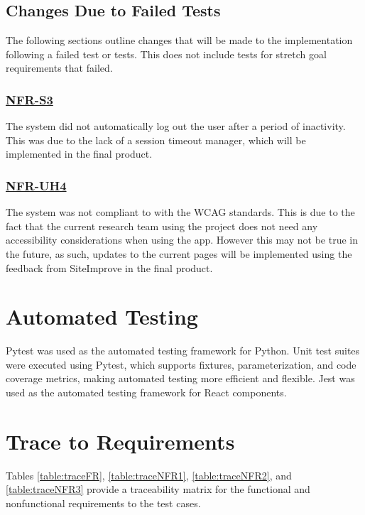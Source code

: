 \documentclass[12pt, titlepage]{article}
\begin{document}

\subsection{Changes Due to Failed Tests}
The following sections outline changes that will be made to the implementation
following a failed test or tests. This does not include tests for stretch goal
requirements that failed.

\subsubsection{\hyperref[NFR:S3]{NFR-S3}} The system did not automatically log
out the user after a period of inactivity. This was due to the lack of a session
timeout manager, which will be implemented in the final product.

\subsubsection{\hyperref[NFR:UH4]{NFR-UH4}} The system was not compliant to with
the WCAG standards. This is due to the fact that the current research team using
the project does not need any accessibility considerations when using the app.
However this may not be true in the future, as such, updates to the current
pages will be implemented using the feedback from SiteImprove in the final
product.

\section{Automated Testing}
Pytest was used as the automated testing framework for Python. Unit test suites
were executed using Pytest, which supports fixtures, parameterization, and code
coverage metrics, making automated testing more efficient and flexible. Jest was
used as the automated testing framework for React components.
		
\section{Trace to Requirements}

Tables \ref{table:traceFR}, \ref{table:traceNFR1}, \ref{table:traceNFR2}, and
\ref{table:traceNFR3} provide a traceability matrix for the functional and
nonfunctional requirements to the test cases.
\end{document}
